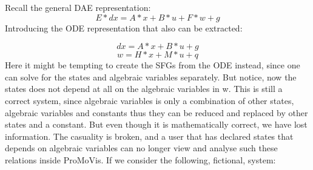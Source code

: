 Recall the general DAE representation:
\begin{equation}
E*dx = A*x + B*u + F*w + g
\end{equation}\newline Introducing the ODE representation that also can be extracted:

\begin{equation}
dx = A*x + B*u + g
\end{equation}
\begin{equation}
w  = H*x + M*u + q
\end{equation}\newline Here it might be tempting to create the SFGs from the ODE instead, since one can solve for the states and algebraic variables separately. But notice, now the states does not depend at all on the algebraic variables in w. This is still a correct system, since algebraic variables is only a combination of other states, algebraic variables and constants thus they can be reduced and replaced by other states and a constant. But even though it is mathematically correct, we have lost information. The casuality is broken, and a user that has declared states that depends on algebraic variables can no longer view and analyse such these relations inside ProMoVis. If we consider the following, fictional, system:

